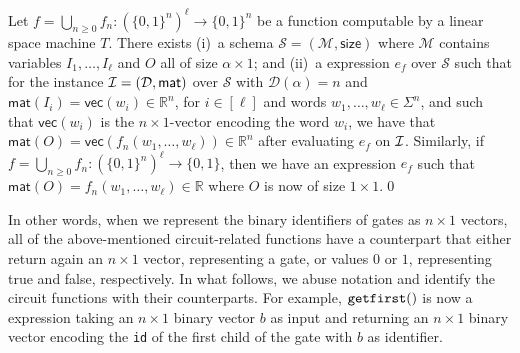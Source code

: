 \begin{proposition} \label{prop:transducer2}
Let $f=\bigcup_{n\geq 0}f_n:(\{0,1\}^n)^\ell\to \{0,1\}^n$ be a function computable by a linear space machine
$T$.
There exists (i)~a \langfor  
schema $\mathcal{S}=(\mathcal{M},\textsf{size})$ where $\mathcal{M}$ contains variables
$I_1,\ldots,I_\ell$ and $O$ all of size $\alpha\times 1$; and (ii)~a \langfor 
expression $e_f$ over $\mathcal{S}$ such that for the instance 
$\mathcal{I}=(\mathcal{D},\textsf{mat})$ over $\mathcal{S}$ with $\mathcal{D}(\alpha)=n$ and 
$\mathsf{mat}(I_i)=\mathsf{vec}(w_i)\in \mathbb{R}^n$,  for $i\in[\ell]$ and words $w_1,\ldots,w_\ell\in\Sigma^n$, and such that $\mathsf{vec}(w_i)$ is the $n\times 1$-vector 
encoding the word $w_i$, we have that  $\mathsf{mat}(O)=\mathsf{vec}(f_n(w_1,\ldots,w_\ell))\in\mathbb{R}^n$ 
after evaluating $e_f$ on $\mathcal{I}$. Similarly, if $f=\bigcup_{n\geq 0}f_n:(\{0,1\}^n)^\ell\to \{0,1\}$, then we have
 an expression $e_f$ such that $\mathsf{mat}(O)=f_n(w_1,\ldots,w_\ell)\in \mathbb{R}$ where $O$ is now of size $1\times 1$.\qed
\end{proposition}

In other words, when we represent the binary identifiers of gates as $n\times 1$ vectors, all of the above-mentioned circuit-related functions have a \langfor counterpart that either return again an $n\times 1$ vector, representing a gate, or values $0$ or $1$, representing true and false, respectively. In what follows, we  abuse notation and identify the circuit functions with their \langfor counterparts. For example, $\texttt{getfirst}()$ is now a \langfor expression taking an $n\times 1$ binary vector $b$ as input and returning an $n\times 1$ binary vector encoding the \texttt{id} of the first child of the gate with $b$ as identifier.
%
%
%


